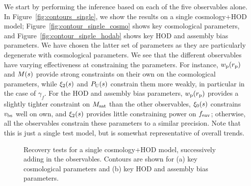 We start by performing the inference based on each of the five observables alone. 
In Figure~\ref{fig:contours_single}, we show the results on a single cosmology+HOD model; Figure~\ref{fig:contour_single_cosmo} shows key cosmological parameters, and Figure~\ref{fig:contour_single_hodab} shows key HOD and assembly bias parameters.
We have chosen the latter set of parameters as they are particularly degenerate with cosmological parameters.
We see that the different observables have varying effectiveness at constraining the parameters. 
For instance, $w_\mathrm{p}(r_\mathrm{p})$ and $M(s)$ provide strong constraints on their own on the cosmological parameters, while $\xi_2(s)$ and $P_\mathrm{U}(s)$ constrain them more weakly, in particular in the case of $\gamma_f$. 
For the HOD and assembly bias parameters, $w_\mathrm{p}(r_\mathrm{p})$ provides a slightly tighter constraint on $M_\mathrm{sat}$ than the other observables, $\xi_0(s)$ constrains $v_\mathrm{bs}$ well on own, and $\xi_2(s)$ provides little constraining power on $f_\mathrm{env}$; otherwise, all the observables constrain these parameters to a similar precision.
Note that this is just a single test model, but is somewhat representative of overall trends.

\begin{figure}
\centering
{}
\hspace{0.07\textwidth}
\caption{Recovery tests for a single cosmology+HOD model, successively adding in the observables. Contours are shown for (a) key cosmological parameters and (b) key HOD and assembly bias parameters.}
\label{fig:contours_addin}
\end{figure}


